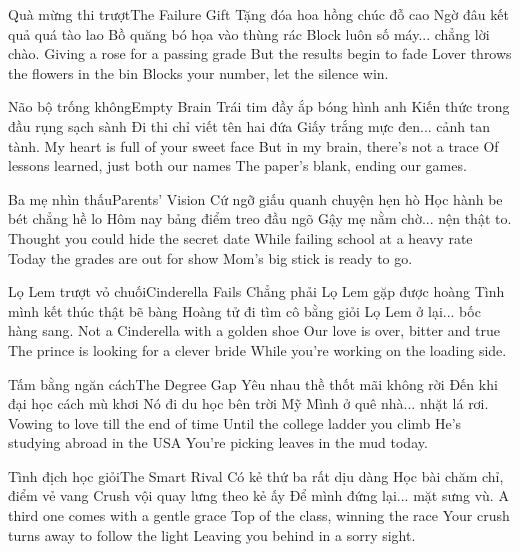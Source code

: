\begin{tutuyetbox}{Quà mừng thi trượt}{The Failure Gift}
Tặng đóa hoa hồng chúc đỗ cao
Ngờ đâu kết quả quá tào lao
Bồ quăng bó họa vào thùng rác
Block luôn số máy... chẳng lời chào.
\tcblower
Giving a rose for a passing grade
But the results begin to fade
Lover throws the flowers in the bin
Blocks your number, let the silence win.
\end{tutuyetbox}

\begin{tutuyetbox}{Não bộ trống không}{Empty Brain}
Trái tim đầy ắp bóng hình anh
Kiến thức trong đầu rụng sạch sành
Đi thi chỉ viết tên hai đứa
Giấy trắng mực đen... cảnh tan tành.
\tcblower
My heart is full of your sweet face
But in my brain, there's not a trace
Of lessons learned, just both our names
The paper's blank, ending our games.
\end{tutuyetbox}

\begin{tutuyetbox}{Ba mẹ nhìn thấu}{Parents' Vision}
Cứ ngỡ giấu quanh chuyện hẹn hò
Học hành be bét chẳng hề lo
Hôm nay bảng điểm treo đầu ngõ
Gậy mẹ nằm chờ... nện thật to.
\tcblower
Thought you could hide the secret date
While failing school at a heavy rate
Today the grades are out for show
Mom's big stick is ready to go.
\end{tutuyetbox}

\begin{tutuyetbox}{Lọ Lem trượt vỏ chuối}{Cinderella Fails}
Chẳng phải Lọ Lem gặp được hoàng
Tình mình kết thúc thật bẽ bàng
Hoàng tử đi tìm cô bằng giỏi
Lọ Lem ở lại... bốc hàng sang.
\tcblower
Not a Cinderella with a golden shoe
Our love is over, bitter and true
The prince is looking for a clever bride
While you're working on the loading side.
\end{tutuyetbox}

\begin{tutuyetbox}{Tấm bằng ngăn cách}{The Degree Gap}
Yêu nhau thề thốt mãi không rời
Đến khi đại học cách mù khơi
Nó đi du học bên trời Mỹ
Mình ở quê nhà... nhặt lá rơi.
\tcblower
Vowing to love till the end of time
Until the college ladder you climb
He's studying abroad in the USA
You're picking leaves in the mud today.
\end{tutuyetbox}

\begin{tutuyetbox}{Tình địch học giỏi}{The Smart Rival}
Có kẻ thứ ba rất dịu dàng
Học bài chăm chỉ, điểm vẻ vang
Crush vội quay lưng theo kẻ ấy
Để mình đứng lại... mặt sưng vù.
\tcblower
A third one comes with a gentle grace
Top of the class, winning the race
Your crush turns away to follow the light
Leaving you behind in a sorry sight.
\end{tutuyetbox}

